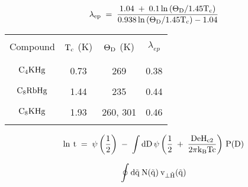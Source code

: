 {\newpage
\clearpage
\samepage \begin{equation}\label{mcmillan}
\rm \lambda_{ep} \; = \; \frac{1.04 \; + \; 0.1 \ln{\left( \Theta_D/1.45 T_c
\right)}}{0.938 \ln{\left( \Theta_D/1.45 T_c \right)} - 1.04}
\end{equation}
}

{\newpage
\clearpage
\samepage \begin{table}
\label{lambdatable}
\begin{center}
\begin{tabular}{|c|ccc|}
\hline
& & & \\ 
Compound & $\rm T_c$ (K) & $\rm \Theta_D$ (K) & $\lambda_{ep}$ \\ 
& & & \\ 
\hline
& & & \\ 
$\rm C_4KHg$ & 0.73\cite{iye82} & 269\cite{alexander81} & 0.38\cite{iye82} \\ 
& & & \\ 
$\rm C_8RbHg$ & 1.44\cite{alexander81} & 235\cite{alexander81} & 0.44\cite{iye82,alexander81} \\ 
& & & \\ 
$\rm C_8KHg$ & 1.93\cite{alexander81} & 260\cite{alexander81}, 301\cite{alexander80} & 0.46\cite{tanuma81,alexander80} \\ 
& & & \\ 
\hline
\end{tabular}
\end{center}
\end{table}
}

{\newpage
\clearpage
\samepage \begin{equation}\label{carter}
\rm \ln \: t \; = \; \psi\left(\frac{1}{2}\right) \; - \; \int dD \, \psi\left(
\frac{1}{2} \; + \; \frac{D e H_{c2}}{2 \pi k_B T c}  \right) \, P(D) 
\end{equation}
}

{\newpage
\clearpage
\samepage \begin{figure}\vspace{7.5in}

\label{inhomo}
\end{figure}
}

{\newpage
\clearpage
\samepage \begin{displaymath}\rm \oint d\vec{q} \:  N(\vec{q}) \: v_{\perp \vec{H}}(\vec{q})
\end{displaymath}
}

{\newpage
\clearpage
\samepage \begin{figure}\vspace{8in}
%

\label{perpexplain}
\end{figure}
}

